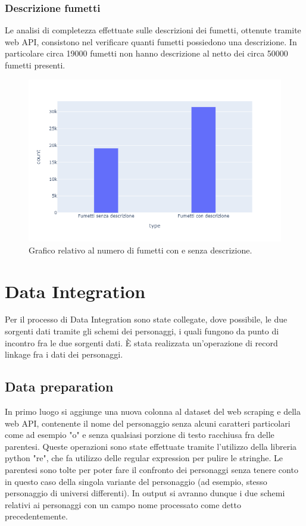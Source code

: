 \documentclass[
12pt, %
a4paper, %
oneside, %
headinclude,footinclude, %
BCOR5mm, %
]{scrartcl}
\begin{document}
\subsubsection{Descrizione fumetti}
Le analisi di completezza effettuate sulle descrizioni dei fumetti, ottenute tramite web API, consistono nel verificare quanti fumetti possiedono una descrizione. In particolare circa 19000 fumetti non hanno descrizione al netto dei circa 50000 fumetti presenti.
\begin{figure}[H]
  \includegraphics[scale=0.5]{./Figures/plot_descrizione_fumetti.png}
  \caption{Grafico relativo al numero di fumetti con e senza descrizione.}
\end{figure}
\section{Data Integration}
Per il processo di Data Integration sono state collegate, dove possibile, le due sorgenti dati tramite gli schemi dei personaggi, i quali fungono da punto di incontro fra le due sorgenti dati. È stata realizzata un'operazione di record linkage fra i dati dei personaggi.
\subsection{Data preparation}
In primo luogo si aggiunge una nuova colonna al dataset del web scraping e della web API, contenente il nome del personaggio senza alcuni caratteri particolari come ad esempio "o" e senza qualsiasi porzione di testo racchiusa fra delle parentesi. Queste operazioni sono state effettuate tramite l'utilizzo della libreria python "re", che fa utilizzo delle regular expression per pulire le stringhe. Le parentesi sono tolte per poter fare il confronto dei personaggi senza tenere conto in questo caso della singola variante del personaggio (ad esempio, stesso personaggio di universi differenti). In output si avranno dunque i due schemi relativi ai personaggi con un campo nome processato come detto precedentemente.
\end{document}
